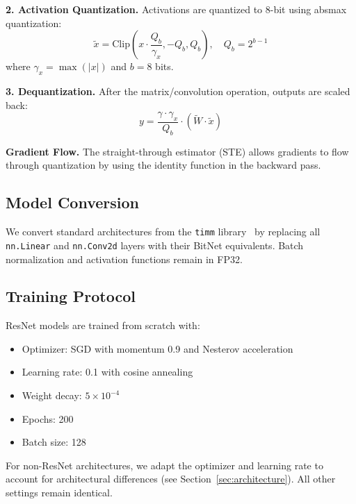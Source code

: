 \documentclass[10pt]{article}
\begin{document}
\textbf{2. Activation Quantization.} Activations are quantized to 8-bit using absmax quantization:
\begin{equation}
    \tilde{x} = \text{Clip}\left(x \cdot \frac{Q_b}{\gamma_x}, -Q_b, Q_b\right), \quad Q_b = 2^{b-1}
\end{equation}
where $\gamma_x = \max(|x|)$ and $b=8$ bits.

\textbf{3. Dequantization.} After the matrix/convolution operation, outputs are scaled back:
\begin{equation}
    y = \frac{\gamma \cdot \gamma_x}{Q_b} \cdot (\tilde{W} \cdot \tilde{x})
\end{equation}

\textbf{Gradient Flow.} The straight-through estimator (STE) allows gradients to flow through quantization by using the identity function in the backward pass.

\subsection{Model Conversion}

We convert standard architectures from the \texttt{timm} library~\cite{rw2019timm} by replacing all \texttt{nn.Linear} and \texttt{nn.Conv2d} layers with their BitNet equivalents. Batch normalization and activation functions remain in FP32.

\subsection{Training Protocol}

ResNet models are trained from scratch with:
\begin{itemize}
    \item Optimizer: SGD with momentum 0.9 and Nesterov acceleration
    \item Learning rate: 0.1 with cosine annealing
    \item Weight decay: $5 \times 10^{-4}$
    \item Epochs: 200
    \item Batch size: 128
\end{itemize}

For non-ResNet architectures, we adapt the optimizer and learning rate to account for architectural differences (see Section~\ref{sec:architecture}). All other settings remain identical.

\end{document}
